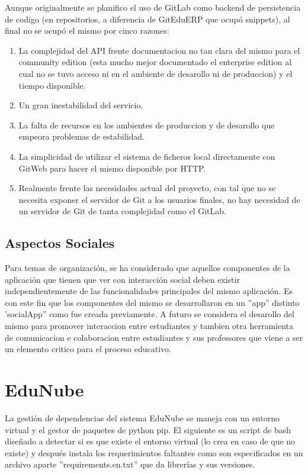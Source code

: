Aunque originalmente se planifico el uso de GitLab como backend de persistencia de codigo (en repositorios, a diferencia de GitEduERP que ocupó snippets), al final no se ocupó el mismo por cinco razones:
\begin{enumerate}
\item La complejidad del API frente documentacion no tan clara del mismo para el community edition (esta mucho mejor documentado el enterprise edition al cual no se tuvo acceso ni en el ambiente de desarollo ni de produccion) y el tiempo disponible.
\item Un gran inestabilidad del servicio.
\item La falta de recursos en los ambientes de produccion y de desarollo que empeora problemas de estabilidad.
\item La simplicidad de utilizar el sistema de ficheros local directamente con GitWeb para hacer el mismo disponible por HTTP.
\item Realmente frente las necesidades actual del proyecto, con tal que no se necesita exponer el servidor de Git a los usuarios finales, no hay necesidad de un servidor de Git de tanta complejidad como el GitLab.
\end{enumerate}

\subsection{Aspectos Sociales}
Para temas de organización, se ha considerado que aquellos componentes de la aplicación que tienen que ver con interacción social deben existir independientemente de las funcionalidades principales del mismo aplicación. Es con este fin que los componentes del mismo se desarrollaron en un ''app'' distinto 'socialApp'' como fue creada previamente. A futuro se considera el desarollo del mismo para promover interaccion entre estudiantes y tambien otra herramienta de comunicacion e colaboracion entre estudiantes y sus professores que viene a ser un elemento critico para el proceso educativo.

\section{EduNube}


La gestión de dependencias del sistema EduNube se maneja con un entorno virtual y el gestor de paquetes de python pip. El siguiente es un script de bash diseñado a detectar si es que existe el entorno virtual (lo crea en caso de que no existe) y después instala los requerimientos faltantes como son especificados en un archivo aparte ''requirements.en.txt'' que da librerías y sus versiones.

